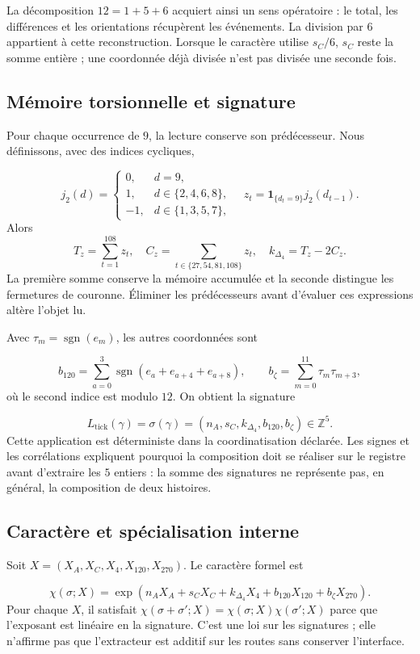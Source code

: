 La décomposition \(12=1+5+6\) acquiert ainsi un sens opératoire :
le total, les différences et les orientations récupèrent les événements.
La division par \(6\) appartient à cette reconstruction. Lorsque le caractère
utilise \(s_C/6\), \(s_C\) reste la somme entière ; une coordonnée déjà
divisée n’est pas divisée une seconde fois.


\subsection{Mémoire torsionnelle et signature
}

Pour chaque occurrence de \(9\), la lecture conserve son prédécesseur.
Nous définissons, avec des indices cycliques,

\[
 j_2(d)=\begin{cases}0,&d=9,\\1,&d\in\{2,4,6,8\},\\-1,&d\in\{1,3,5,7\},\end{cases}
 \quad z_t=\mathbf1_{\{d_t=9\}}j_2(d_{t-1}).
\]
Alors
\[
 T_z=\sum_{t=1}^{108}z_t,\quad
 C_z=\sum_{t\in\{27,54,81,108\}}z_t,\quad
 k_{\Delta_4}=T_z-2C_z.
\]
La première somme conserve la mémoire accumulée et la seconde distingue les
fermetures de couronne. Éliminer les prédécesseurs avant d’évaluer ces
expressions altère l’objet lu.


Avec \(\tau_m=\operatorname{sgn}(e_m)\), les autres coordonnées sont

\[
 b_{120}=\sum_{a=0}^{3}\operatorname{sgn}(e_a+e_{a+4}+e_{a+8}),
 \qquad b_{\zeta}=\sum_{m=0}^{11}\tau_m\tau_{m+3},
\]
où le second indice est modulo \(12\). On obtient la signature

\[
 L_{\mathrm{tick}}(\gamma)
 =\sigma(\gamma)=(n_A,s_C,k_{\Delta_4},b_{120},b_{\zeta})\in\mathbb Z^5.
\]
Cette application est déterministe dans la coordinatisation déclarée. Les signes et les
corrélations expliquent pourquoi la composition doit se réaliser sur le
registre avant d’extraire les \(5\) entiers : la somme des signatures ne
représente pas, en général, la composition de deux histoires.


\subsection{Caractère et spécialisation interne
}

Soit \(X=(X_A,X_C,X_4,X_{120},X_{270})\). Le caractère formel est

\[
 \chi(\sigma;X)=\exp\!\left(n_AX_A+s_CX_C+k_{\Delta_4}X_4+
 b_{120}X_{120}+b_{\zeta}X_{270}\right).
\]
Pour chaque \(X\), il satisfait
\(\chi(\sigma+\sigma';X)=\chi(\sigma;X)\chi(\sigma';X)\)
parce que l’exposant est linéaire en la signature. C’est une loi sur les signatures ; elle
n’affirme pas que l’extracteur est additif sur les routes sans conserver l’interface.


